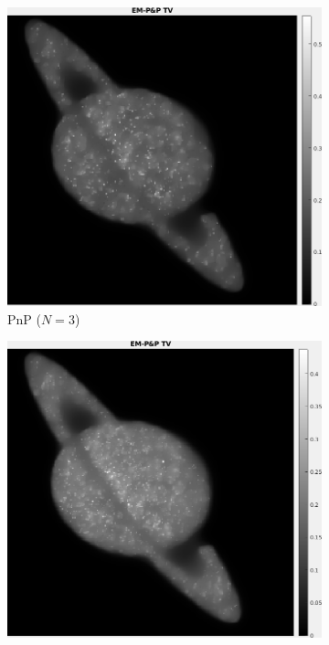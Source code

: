 \documentclass[a4paper, 11pt]{article}
\begin{document}
\begin{figure}[h]
\begin{subfigure}[b]{0.22\textwidth}
        \includegraphics[width=\textwidth]{../Figures/PnPReconstructionNoiseSigma1e-3Realization3.png}
        \caption{PnP ($N=3$)}
        \label{fig:PnP-2}
    \end{subfigure}
    \begin{subfigure}[b]{0.22\textwidth}
        \includegraphics[width=\textwidth]{../Figures/PnPReconstructionNoiseSigma1e-3Realization6.png}

\end{subfigure}
\end{figure}
\end{document}
